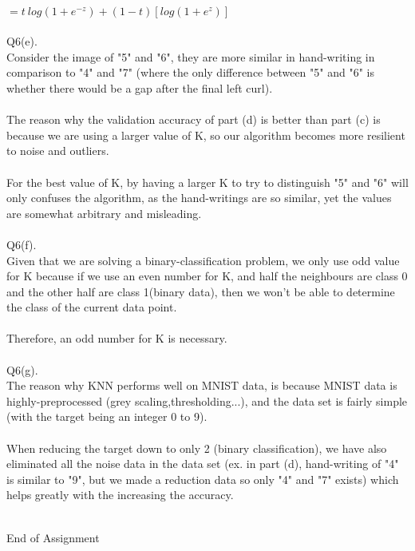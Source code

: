 \documentclass{article}
\begin{document}
{\\
\indent \indent $=t\:log(1+e^{-z})+(1-t)[log(1+e^z)]$\\
\\
Q6(e).\\
\indent \indent Consider the image of "5" and "6", they are more similar in hand-writing in comparison to "4" and "7" (where the only difference between "5" and "6" is whether there would be a gap after the final left curl).\\
\\
\indent \indent The reason why the validation accuracy of part (d) is better than part (c) is because we are using a larger value of K, so our algorithm becomes more resilient to noise and outliers.\\
\\
\indent \indent For the best value of K, by having a larger K to try to distinguish "5" and "6" will only confuses the algorithm, as the hand-writings are so similar, yet the values are somewhat arbitrary and misleading.\\
\\
Q6(f).\\
\indent \indent Given that we are solving a binary-classification problem, we only use odd value for K because if we use an even number for K, and half the neighbours are class 0 and the other half are class 1(binary data), then we won't be able to determine the class of the current data point.\\
\\
\indent \indent Therefore, an odd number for K is necessary.\\
\\
Q6(g).\\
\indent \indent The reason why KNN performs well on MNIST data, is because MNIST data is highly-preprocessed (grey scaling,thresholding...), and the data set is fairly simple (with the target being an integer 0 to 9).\\
\\
\indent \indent When reducing the target down to only 2 (binary classification), we have also eliminated all the noise data in the data set (ex. in part (d), hand-writing of "4" is similar to "9", but we made a reduction data so only "4" and "7" exists) which helps greatly with the increasing the accuracy.\\
\\
}

\begin{center}
    End of Assignment
\end{center}
\end{document}
